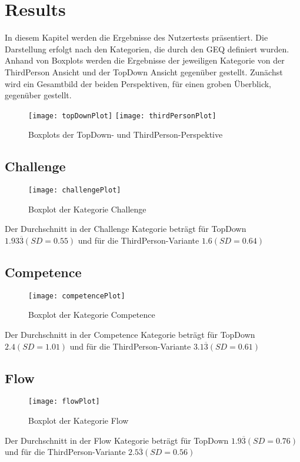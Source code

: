 \chapter{Results} %
In diesem Kapitel werden die Ergebnisse des Nutzertests präsentiert. Die Darstellung erfolgt nach den Kategorien, die durch den GEQ definiert wurden. Anhand von Boxplots werden die Ergebnisse der jeweiligen Kategorie von der ThirdPerson Ansicht und der TopDown Ansicht gegenüber gestellt.
Zunächst wird ein Gesamtbild der beiden Perspektiven, für einen groben Überblick, gegenüber gestellt.
\begin{figure}[h!tb]
	\centering
	\texttt{[image: topDownPlot]}
	\texttt{[image: thirdPersonPlot]}
	\caption{Boxplots der TopDown- und ThirdPerson-Perspektive\label{fig:topthirdbox}}
\end{figure}
\section{Challenge}
\begin{figure}[h!tb]
	\centering
	\texttt{[image: challengePlot]}
	\caption{Boxplot der Kategorie Challenge\label{fig:challengebox}}
\end{figure}
Der Durchschnitt in der Challenge Kategorie beträgt für TopDown  $1.93\overline{3}(SD = 0.55)$ und für die ThirdPerson-Variante $1.6(SD =0.64 )$
\section{Competence}
\begin{figure}[h!tb]
	\centering
	\texttt{[image: competencePlot]}
	\caption{Boxplot der Kategorie Competence\label{fig:competencebox}}
\end{figure}
Der Durchschnitt in der Competence Kategorie beträgt für TopDown  $2.4(SD = 1.01)$ und für die ThirdPerson-Variante $3.1\overline{3}(SD =0.61 )$
\section{Flow}
\begin{figure}[h!tb]
	\centering
	\texttt{[image: flowPlot]}
	\caption{Boxplot der Kategorie Flow\label{fig:flowbox}}
\end{figure}
Der Durchschnitt in der Flow Kategorie beträgt für TopDown  $1.9\overline{3}(SD = 0.76)$ und für die ThirdPerson-Variante $2.5\overline{3}(SD =0.56 )$
